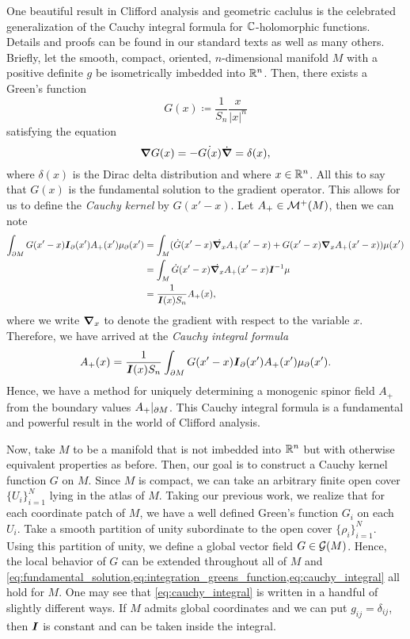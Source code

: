 One beautiful result in Clifford analysis and geometric caclulus is the celebrated generalization of the Cauchy integral formula for $\mathbb{C}$-holomorphic functions. Details and proofs can be found in our standard texts \cite{doran_geometric_2003,hestenes_clifford_1984} as well as many others. Briefly, let the smooth, compact, oriented, $n$-dimensional manifold $M$ with a positive definite $g$ be isometrically imbedded into $\mathbb{R}^n$. Then, there exists a Green's function
\begin{equation}
G(x)\coloneqq \frac{1}{S_n} \frac{x}{|x|^n}
\end{equation}
satisfying the equation
\begin{equation}
\label{eq:fundamental_solution}
\boldsymbol{\nabla} G(x) = -\dot{G(x)}\dot{\boldsymbol{\nabla}} = \delta(x),
\end{equation}
where $\delta(x)$ is the Dirac delta distribution and where $x\in \mathbb{R}^n$. All this to say that $G(x)$ is the fundamental solution to the gradient operator. This allows for us to define the \emph{Cauchy kernel} by $G(x'-x)$. Let $A_+ \in \mathcal{M}^{+}(M)$, then we can note
\begin{align}
\label{eq:integration_greens_function}
\int_{\partial M} G(x'-x) \boldsymbol{I}_\partial(x') A_+(x') \mu_\partial(x') &= \int_M (\dot{G}(x'-x)\dot{\boldsymbol{\nabla}_x} A_+(x'-x) + G(x'-x)\boldsymbol{\nabla}_x A_+(x'-x))\mu(x')\\
&= \int_M \dot{G}(x'-x)\dot{\boldsymbol{\nabla}_x}A_+(x'-x) \boldsymbol{I}^{-1} \mu \\
&= \frac{1}{\boldsymbol{I}(x) S_n} A_+(x),
\end{align}
where we write $\boldsymbol{\nabla}_x$ to denote the gradient with respect to the variable $x$. Therefore, we have arrived at the \emph{Cauchy integral formula}
\begin{equation}
\label{eq:cauchy_integral}
A_+(x) = \frac{1}{\boldsymbol{I}(x) S_n} \int_{\partial M} G(x'-x) \boldsymbol{I}_\partial(x') A_+(x') \mu_\partial(x').
\end{equation}
Hence, we have a method for uniquely determining a monogenic spinor field $A_+$ from the boundary values $A_+\vert_{\partial M}$. This Cauchy integral formula is a fundamental and powerful result in the world of Clifford analysis. 

Now, take $M$ to be a manifold that is not imbedded into $\mathbb{R}^n$ but with otherwise equivalent properties as before. Then, our goal is to construct a Cauchy kernel function $G$ on $M$. Since $M$ is compact, we can take an arbitrary finite open cover $\{U_i\}_{i=1}^{N}$ lying in the atlas of $M$. Taking our previous work, we realize that for each coordinate patch of $M$, we have a well defined Green's function $G_i$ on each $U_i$. Take a smooth partition of unity subordinate to the open cover $\{\rho_i\}_{i=1}^N$. Using this partition of unity, we define a global vector field $G \in \mathcal{G}(M)$. Hence, the local behavior of $G$ can be extended throughout all of $M$ and \cref{eq:fundamental_solution,eq:integration_greens_function,eq:cauchy_integral} all hold for $M$. One may see that \cref{eq:cauchy_integral} is written in a handful of slightly different ways. If $M$ admits global coordinates and we can put $g_{ij}=\delta_{ij}$, then $\boldsymbol{I}$ is constant and can be taken inside the integral.
